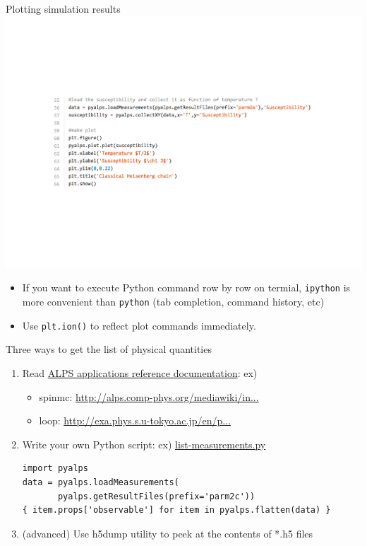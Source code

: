 \begin{frame}[t,fragile]{Plotting simulation results}
  \includegraphics[height=.5\textheight]{tutorial2a-3.pdf}
  \begin{itemize}
  \item If you want to execute Python command row by row on termial, {\color{red}\tt ipython} is more convenient than {\tt python} (tab completion, command history, etc)
  \item Use {\color{red}\tt plt.ion()} to reflect plot commands immediately.
  \end{itemize}
\end{frame}

\begin{frame}[t,fragile]{Three ways to get the list of physical quantities}
  \begin{enumerate}
    \setlength{\itemsep}{1em}
  \item Read \href{http://alps.comp-phys.org/mediawiki/index.php/ALPS_2_Documentation:Overview}{ALPS applications reference documentation}: ex)
    \begin{itemize}
    \item spinmc: {\footnotesize \href{http://alps.comp-phys.org/mediawiki/index.php/Documentation:ClassicalMCSimulations}{http://alps.comp-phys.org/mediawiki/in...}}
    \item loop: {\footnotesize \href{http://exa.phys.s.u-tokyo.ac.jp/en/projects/alps-looper}{http://exa.phys.s.u-tokyo.ac.jp/en/p...}}
    \end{itemize}
  \item Write your own Python script: ex) \href{https://gist.github.com/wistaria/71cb8d7a22f45bfe256d}{list-measurements.py}
\begin{lstlisting}
import pyalps
data = pyalps.loadMeasurements(
       pyalps.getResultFiles(prefix='parm2c'))
{ item.props['observable'] for item in pyalps.flatten(data) }
\end{lstlisting}
  \item (advanced) Use h5dump utility to peek at the contents of *.h5 files
  \end{enumerate}
\end{frame}

